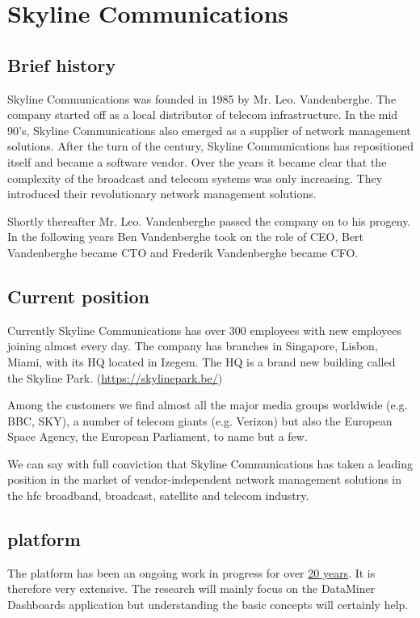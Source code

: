 
\chapter{Skyline Communications}
\section{Brief history}

Skyline Communications was founded in 1985 by Mr. Leo. Vandenberghe. The company started off as a local distributor of telecom infrastructure. In the mid 90's, Skyline Communications also emerged as a supplier of network management solutions. After the turn of the century, Skyline Communications has repositioned itself and became a software vendor. Over the years it became clear that the complexity of the broadcast and telecom systems was only increasing. They introduced their revolutionary \dm network management solutions.

Shortly thereafter Mr. Leo. Vandenberghe passed the company on to his progeny. In the following years Ben Vandenberghe took on the role of CEO, Bert Vandenberghe became CTO and Frederik Vandenberghe became CFO. 

\section{Current position}

Currently Skyline Communications has over 300 employees with new employees joining almost every day. 
The company has branches in Singapore, Lisbon, Miami, with its HQ located in Izegem. 
The HQ is a brand new building called the Skyline Park. (\url{https://skylinepark.be/})

Among the customers we find almost all the major media groups worldwide (e.g. BBC, SKY), a number of telecom giants (e.g. Verizon) but also the European Space Agency, the European Parliament, to name but a few. 

We can say with full conviction that Skyline Communications has taken a leading position in the market of vendor-independent network management solutions in the \gls{hfc} broadband, broadcast, satellite and telecom industry. 

\section{\dm platform}

The \dm platform has been an ongoing work in progress for over \underline{20 years}. It is therefore very extensive. The research will mainly focus on the DataMiner Dashboards application but understanding the basic concepts will certainly help.


